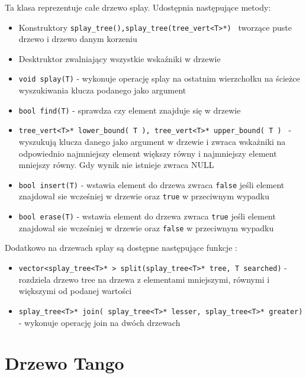 \documentclass[declaration,shortabstract]{iithesis}
\theoremstyle{thm}
\theoremstyle{remark}
\theoremstyle{plain}
\theoremstyle{plain}
\theoremstyle{plain}
\begin{document}
Ta klasa reprezentuje całe drzewo splay. Udostępnia następujące metody: 

\begin{itemize}

\item{Konstruktory \texttt{splay\_tree(),splay\_tree(tree\_vert<T>*) } tworzące puste drzewo i drzewo danym korzeniu }

\item{Desktruktor zwalniający wszystkie wskaźniki w drzewie}

\item{\texttt{void splay(T)} - wykonuje operację splay na ostatnim wierzchołku na ścieżce wyszukiwania klucza podanego jako argument}

\item{\texttt{bool find(T)} - sprawdza czy element znajduje się w drzewie}
    
\item{\texttt{tree\_vert<T>* lower\_bound( T ), tree\_vert<T>* upper\_bound( T ) } - wyszukują klucza danego jako argument w drzewie i zwraca wskażniki na odpowiednio najmniejszy element większy równy i najmniejszy element mniejszy równy. Gdy wynik nie istnieje zwraca NULL }
   
\item{\texttt{bool insert(T)} - wstawia element do drzewa zwraca \texttt{false} jeśli element znajdował sie wcześniej w drzewie oraz \texttt{true} w przeciwnym wypadku}
\item{\texttt{bool erase(T)} - wstawia element do drzewa zwraca \texttt{true} jeśli element znajdował sie wcześniej w drzewie oraz \texttt{false} w przeciwnym wypadku}

\end{itemize}

Dodatkowo na drzewach splay są dostępne następujące funkcje : 

\begin{itemize}

\item{\texttt{vector<splay\_tree<T>* > split(splay\_tree<T>* tree, T searched)} - rozdziela drzewo tree na drzewa z elementami mniejszymi, równymi i większymi od podanej wartości}
\item{\texttt{splay\_tree<T>* join( splay\_tree<T>* lesser, splay\_tree<T>* greater)} - wykonuje operację join na dwóch drzewach}

\end{itemize}

\chapter{ Drzewo Tango}
\end{document}
